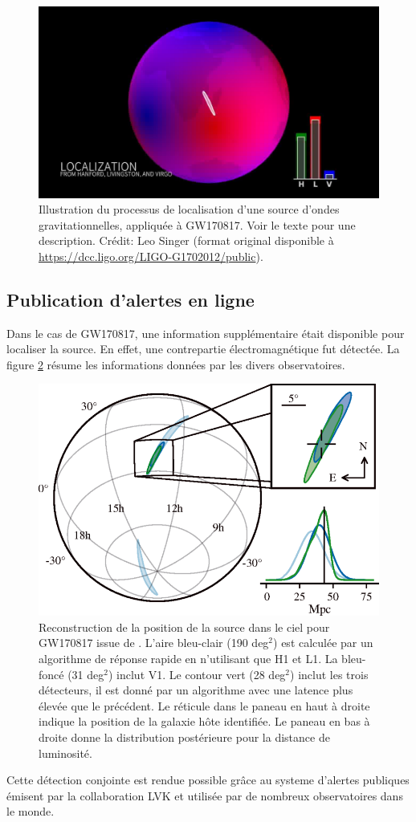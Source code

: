 \begin{figure}
\begin{minipage}{0.45\linewidth}
    \includegraphics[width=\linewidth]{sectionDetection/antenna-patterns_LeoSinger/00900.jpg}
  \end{minipage}
  \hfill
  \caption{Illustration du processus de localisation d'une source d'ondes gravitationnelles, appliquée à GW170817. Voir le texte pour une description. Crédit: Leo Singer (format original disponible à \url{https://dcc.ligo.org/LIGO-G1702012/public}).}
  \label{fig:localization}
\end{figure}


\subsection{Publication d'alertes en ligne}
Dans le cas de GW170817, une information supplémentaire était disponible pour localiser la source.
En effet, une contrepartie électromagnétique fut détectée.
La figure \ref{fig:gw170817_location} résume les informations données par les divers observatoires.
%
\begin{figure}
  \centering
  \includegraphics[width=0.5\linewidth]{sectionDetection/gw170817_location.png}
  \caption{Reconstruction de la position de la source dans le ciel pour GW170817 issue de \cite{gw170817}.
    L'aire bleu-clair (190 deg$^2$) est calculée par un algorithme de réponse rapide en n'utilisant que H1 et L1.
    La bleu-foncé (31 deg$^2$) inclut V1.
    Le contour vert (28 deg$^2$) inclut les trois détecteurs, il est donné par un algorithme avec une latence plus élevée que le précédent.
    Le réticule dans le paneau en haut à droite indique la position de la galaxie hôte identifiée.
    Le paneau en bas à droite donne la distribution postérieure pour la distance de luminosité.}
  \label{fig:gw170817_location}
\end{figure}
%
Cette détection conjointe est rendue possible grâce au systeme d'alertes publiques émisent par la collaboration LVK et utilisée par de nombreux observatoires dans le monde.

